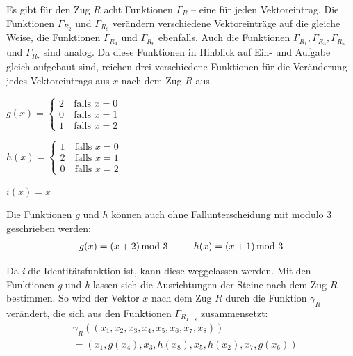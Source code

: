 \documentclass[12pt,a4paper, usenames, dvipsnames]{article}
\theoremstyle{mystyle}
\theoremstyle{definition}
\begin{document}
Es gibt für den Zug $R$ acht Funktionen $\Gamma_R$ -- eine für jeden Vektoreintrag. Die Funktionen $\Gamma_{R_2}$ und $\Gamma_{R_8}$ verändern verschiedene Vektoreinträge auf die gleiche Weise, die Funktionen $\Gamma_{R_4}$ und $\Gamma_{R_6}$ ebenfalls. Auch die Funktionen $\Gamma_{R_1}, \Gamma_{R_3}, \Gamma_{R_5}$ und $\Gamma_{R_7}$ sind analog. Da diese Funktionen in Hinblick auf Ein- und Aufgabe gleich aufgebaut sind, reichen drei verschiedene Funktionen für die Veränderung jedes Vektoreintrags aus $x$ nach dem Zug $R$ aus.
\\

\begin{minipage}{0.35\textwidth}
\centering
$g(x)= \begin{cases}
2 & \ \text{falls } x = 0 \\ 
0 & \ \text{falls } x = 1 \\
1 & \ \text{falls } x = 2 
\end{cases}$
\end{minipage}
\begin{minipage}{0.35\textwidth}
\centering
$h(x)= \begin{cases}
1 & \ \text{falls } x = 0 \\ 
2 & \ \text{falls } x = 1 \\
0 & \ \text{falls } x = 2 
\end{cases}$
\end{minipage}
\begin{minipage}{0.3\textwidth}
\centering
$i(x) = x$
\end{minipage}
\vspace*{1em}

Die Funktionen $g$ und $h$ können auch ohne Fallunterscheidung mit modulo 3 geschrieben werden:
\begin{align*}
g(x)=(x+2) \hspace*{-0.5em} \mod 3 \ \ \ \ \ \ \ \ h(x) = (x+1) \hspace*{-0.5em} \mod 3
\end{align*}

Da \textit{i} die Identitätsfunktion ist, kann diese weggelassen werden.
Mit den Funktionen \textit{g} und \textit{h} lassen sich die Ausrichtungen der Steine nach dem Zug $R$ bestimmen. So wird der Vektor $x$ nach dem Zug $R$ durch die Funktion $\gamma_R$ verändert, die sich aus den Funktionen $\Gamma_{R_{1-8}}$ zusammensetzt:
\begin{align*}
& \gamma_R \left( (x_1, x_2, x_3, x_4, x_5, x_6, x_7, x_8  ) \right) \\ 
& =  \left( x_1, g(x_4), x_3, h(x_8), x_5, h(x_2), x_7, g(x_6) \right)
\end{align*}
\end{document}
